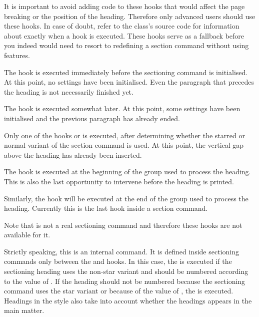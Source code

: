 It is important to avoid adding code to these hooks that
would affect the page breaking or the position of the heading. Therefore only
advanced users should use these hooks. In case of doubt, refer to the class's
source code for information about exactly when a hook is executed. These hooks
serve as a fallback before you indeed would need to resort to redefining
a section command without using \KOMAScript{} features.

The hook
 is executed immediately before the
sectioning command is initialised. At this point, no settings have been
initialised. Even the paragraph that precedes the heading is not
necessarily finished yet.

The hook
 is executed somewhat later. At this
point, some settings have been initialised and the previous paragraph has
already ended.

Only one of the hooks
 or
 is executed, after determining
whether the starred or normal variant of the section command is used. At this
point, the vertical gap above the heading has already been inserted.

The hook
 is executed at the beginning of
the group used to process the heading. This is also the last opportunity to
intervene before the heading is printed.

Similarly\textnote{\DoHook{\dots/\begingroup/\dots}}, the hook
 will be executed at the end of the
group used to process the heading. Currently this is the last hook inside
a section command.

Note that 
 is not a real sectioning command and therefore
these hooks are not available for it.%
\EndIndexGroup

\begin{Declaration}
\end{Declaration}
Strictly speaking, this is an internal command. It is defined
inside sectioning commands only between the 
and  hooks. In this case, the
 is executed if the sectioning heading uses the non-star
variant and should be numbered according to the value of
. If the heading should not be numbered
because the sectioning command uses the star variant or because of the value
of , the  is executed.
Headings in the  style also take into account whether
the headings appears in the main matter.

